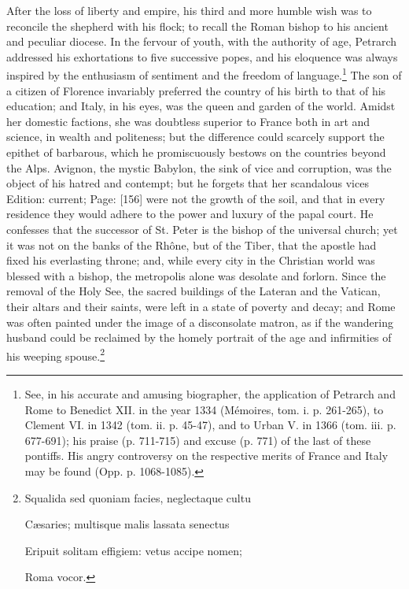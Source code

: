 After the loss of liberty and empire, his third and more humble wish was to reconcile the shepherd with his flock; to recall the Roman bishop to his ancient and peculiar diocese. In the fervour of youth, with the authority of age, Petrarch addressed his exhortations to five successive popes, and his eloquence was always inspired by the enthusiasm of sentiment and the freedom of language.\footnote{See, in his accurate and amusing biographer, the application of Petrarch and Rome to Benedict XII. in the year 1334 (Mémoires, tom. i. p. 261-265), to Clement VI. in 1342 (tom. ii. p. 45-47), and to Urban V. in 1366 (tom. iii. p. 677-691); his praise (p. 711-715) and excuse (p. 771) of the last of these pontiffs. His angry controversy on the respective merits of France and Italy may be found (Opp. p. 1068-1085).} The son of a citizen of Florence invariably preferred the country of his birth to that of his education; and Italy, in his eyes, was the queen and garden of the world. Amidst her domestic factions, she was doubtless superior to France both in art and science, in wealth and politeness; but the difference could scarcely support the epithet of barbarous, which he promiscuously bestows on the countries beyond the Alps. Avignon, the mystic Babylon, the sink of vice and corruption, was the object of his hatred and contempt; but he forgets that her scandalous vices Edition: current; Page: [156] were not the growth of the soil, and that in every residence they would adhere to the power and luxury of the papal court. He confesses that the successor of St. Peter is the bishop of the universal church; yet it was not on the banks of the Rhône, but of the Tiber, that the apostle had fixed his everlasting throne; and, while every city in the Christian world was blessed with a bishop, the metropolis alone was desolate and forlorn. Since the removal of the Holy See, the sacred buildings of the Lateran and the Vatican, their altars and their saints, were left in a state of poverty and decay; and Rome was often painted under the image of a disconsolate matron, as if the wandering husband could be reclaimed by the homely portrait of the age and infirmities of his weeping spouse.\footnote{Squalida sed quoniam facies, neglectaque cultu

Cæsaries; multisque malis lassata senectus

Eripuit solitam effigiem: vetus accipe nomen;

Roma vocor.

}
